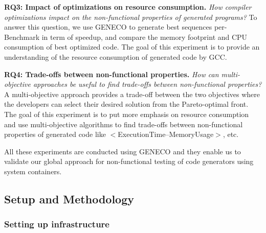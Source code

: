 \textbf{RQ3: Impact of optimizations on resource consumption.} 
\textit{How compiler optimizations impact on the non-functional properties of generated programs?}
To answer this question, we use GENECO to generate best sequences per-Benchmark in term of speedup, and compare the memory footprint and CPU consumption of best optimized code. The goal of this experiment is to provide an understanding of the resource consumption of generated code by GCC. 

\textbf{RQ4: Trade-offs between non-functional properties.} 
\textit{How can multi-objective approaches be useful to find trade-offs between non-functional properties?}
A multi-objective approach provides a trade-off between the two objectives
where the developers can select their desired solution from the Pareto-optimal front. The goal of this experiment is to put more emphasis on resource consumption and use multi-objective algorithms to find trade-offs between non-functional properties of generated code like $<$ExecutionTime--MemoryUsage$>$, etc.


All these experiments are conducted using GENECO and they enable us to validate our global approach for non-functional testing of code generators using system containers. 

\subsection{Setup and Methodology}
\subsubsection{Setting up infrastructure}

